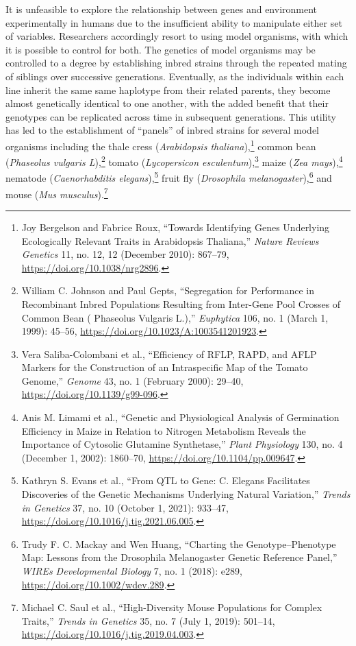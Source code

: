 \documentclass[
]{book}
\begin{document}
It is unfeasible to explore the relationship between genes and environment experimentally in humans due to the insufficient ability to manipulate either set of variables. Researchers accordingly resort to using model organisms, with which it is possible to control for both. The genetics of model organisms may be controlled to a degree by establishing inbred strains through the repeated mating of siblings over successive generations. Eventually, as the individuals within each line inherit the same same haplotype from their related parents, they become almost genetically identical to one another, with the added benefit that their genotypes can be replicated across time in subsequent generations. This utility has led to the establishment of ``panels'' of inbred strains for several model organisms including the thale cress (\emph{Arabidopsis thaliana}),\footnote{Joy Bergelson and Fabrice Roux, {``Towards Identifying Genes Underlying Ecologically Relevant Traits in {Arabidopsis} Thaliana,''} \emph{Nature Reviews Genetics} 11, no. 12, 12 (December 2010): 867--79, \url{https://doi.org/10.1038/nrg2896}.} common bean (\emph{Phaseolus vulgaris L}),\footnote{William C. Johnson and Paul Gepts, {``Segregation for Performance in Recombinant Inbred Populations Resulting from Inter-Gene Pool Crosses of Common Bean ( {Phaseolus} Vulgaris {L}.),''} \emph{Euphytica} 106, no. 1 (March 1, 1999): 45--56, \url{https://doi.org/10.1023/A:1003541201923}.} tomato (\emph{Lycopersicon esculentum}),\footnote{Vera Saliba-Colombani et al., {``Efficiency of {RFLP}, {RAPD}, and {AFLP} Markers for the Construction of an Intraspecific Map of the Tomato Genome,''} \emph{Genome} 43, no. 1 (February 2000): 29--40, \url{https://doi.org/10.1139/g99-096}.} maize (\emph{Zea mays}),\footnote{Anis M. Limami et al., {``Genetic and {Physiological Analysis} of {Germination Efficiency} in {Maize} in {Relation} to {Nitrogen Metabolism Reveals} the {Importance} of {Cytosolic Glutamine Synthetase},''} \emph{Plant Physiology} 130, no. 4 (December 1, 2002): 1860--70, \url{https://doi.org/10.1104/pp.009647}.} nematode (\emph{Caenorhabditis elegans}),\footnote{Kathryn S. Evans et al., {``From {QTL} to Gene: {C}. Elegans Facilitates Discoveries of the Genetic Mechanisms Underlying Natural Variation,''} \emph{Trends in Genetics} 37, no. 10 (October 1, 2021): 933--47, \url{https://doi.org/10.1016/j.tig.2021.06.005}.} fruit fly (\emph{Drosophila melanogaster}),\footnote{Trudy F. C. Mackay and Wen Huang, {``Charting the Genotype--Phenotype Map: Lessons from the {Drosophila} Melanogaster {Genetic Reference Panel},''} \emph{WIREs Developmental Biology} 7, no. 1 (2018): e289, \url{https://doi.org/10.1002/wdev.289}.} and mouse (\emph{Mus musculus}).\footnote{Michael C. Saul et al., {``High-{Diversity Mouse Populations} for {Complex Traits},''} \emph{Trends in Genetics} 35, no. 7 (July 1, 2019): 501--14, \url{https://doi.org/10.1016/j.tig.2019.04.003}.}
\end{document}
